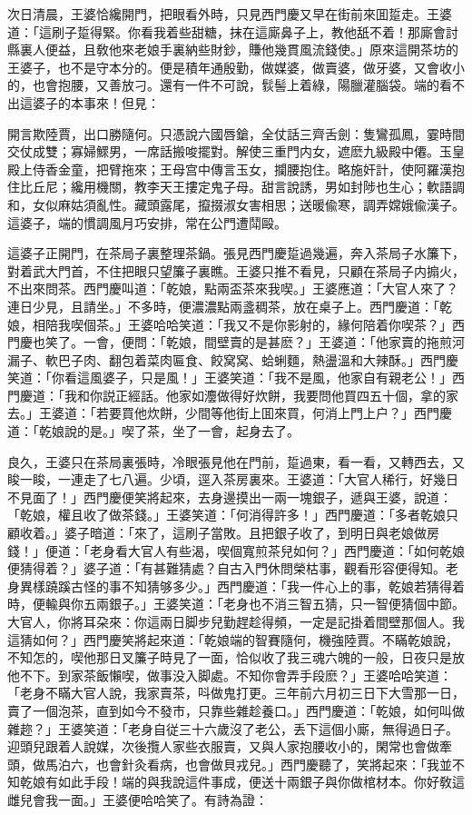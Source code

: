 次日清晨，王婆恰纔開門，把眼看外時，只見西門慶又早在街前來囬踅走。王婆道：「這刷子踅得緊。你看我着些甜糖，抹在這廝鼻子上，教他舐不着！那廝會討縣裏人便益，且敎他來老娘手裏納些財鈔，賺他幾貫風流錢使。」原來這開茶坊的王婆子，也不是守本分的。便是積年通殷勤，做媒婆，做賣婆，做牙婆，又會收小的，也會抱腰，又善放刁。還有一件不可說，䯼髻上着綠，陽臘灌腦袋。端的看不出這婆子的本事來！但見：

開言欺陸賈，出口勝隨何。只憑說六國唇鎗，全仗話三齊舌劍：隻鸞孤鳳，霎時間交仗成雙；寡婦鰥男，一席話搬唆擺對。解使三重門内女，遮麽九級殿中僊。玉皇殿上侍香金童，把臂拖來；王母宫中傳言玉女，攔腰抱住。略施奸計，使阿羅漢抱住比丘尼；纔用機關，教李天王摟定鬼子母。甜言說誘，男如封陟也生心；軟語調和，女似麻姑須亂性。藏頭露尾，攛掇淑女害相思；送暖偸寒，調弄嫦娥偸漢子。這婆子，端的慣調風月巧安排，常在公門遭鬦毆。

這婆子正開門，在茶局子裏整理茶鍋。張見西門慶踅過幾遍，奔入茶局子水簾下，對着武大門首，不住把眼只望簾子裏瞧。王婆只推不看見，只顧在茶局子内搧火，不出來問茶。西門慶叫道：「乾娘，點兩盃茶來我喫。」王婆應道：「大官人來了？連日少見，且請坐。」不多時，便濃濃點兩盞稠茶，放在桌子上。西門慶道：「乾娘，相陪我喫個茶。」王婆哈哈笑道：「我又不是你影射的，緣何陪着你喫茶？」西門慶也笑了。一會，便問：「乾娘，間壁賣的是甚麽？」王婆道：「他家賣的拖煎河漏子、軟巴子肉、翻包着菜肉匾食、餃窝窝、蛤蜊麵，熱盪溫和大辣酥。」西門慶笑道：「你看這風婆子，只是風！」王婆笑道：「我不是風，他家自有親老公！」西門慶道：「我和你説正經話。他家如灋做得好炊餅，我要問他買四五十個，拿的家去。」王婆道：「若要買他炊餅，少間等他街上囬來買，何消上門上户？」西門慶道：「乾娘說的是。」喫了茶，坐了一會，起身去了。

良久，王婆只在茶局裏張時，冷眼張見他在門前，踅過東，看一看，又轉西去，又睃一睃，一連走了七八遍。少頃，逕入茶房裏來。王婆道：「大官人稀行，好幾日不見面了！」西門慶便笑將起來，去身邊摸出一兩一塊銀子，遞與王婆，說道：「乾娘，權且收了做茶錢。」王婆笑道：「何消得許多！」西門慶道：「多者乾娘只顧收着。」婆子暗道：「來了，這刷子當敗。且把銀子收了，到明日與老娘做房錢！」便道：「老身看大官人有些渴，喫個寬煎茶兒如何？」西門慶道：「如何乾娘便猜得着？」婆子道：「有甚難猜處？自古入門休問榮枯事，觀看形容便得知。老身異樣蹺蹊古怪的事不知猜够多少。」西門慶道：「我一件心上的事，乾娘若猜得着時，便輸與你五兩銀子。」王婆笑道：「老身也不消三智五猜，只一智便猜個中節。大官人，你將耳朶來：你這兩日脚步兒勤趕趁得頻，一定是記掛着間壁那個人。我這猜如何？」西門慶笑將起來道：「乾娘端的智賽隨何，機強陸賈。不瞞乾娘說，不知怎的，喫他那日叉簾子時見了一面，恰似收了我三魂六魄的一般，日夜只是放他不下。到家茶飯懶喫，做事没入脚處。不知你會弄手段麽？」王婆哈哈笑道：「老身不瞞大官人說，我家賣茶，呌做鬼打更。三年前六月初三日下大雪那一日，賣了一個泡茶，直到如今不發市，只靠些雜趁養口。」西門慶道：「乾娘，如何叫做雜趂？」王婆笑道：「老身自従三十六歲沒了老公，丢下這個小廝，無得過日子。迎頭兒跟着人說媒，次後攬人家些衣服賣，又與人家抱腰收小的，閑常也會做牽頭，做馬泊六，也會針灸看病，也會做貝戎兒。」西門慶聽了，笑將起來：「我並不知乾娘有如此手段！端的與我說這件事成，便送十兩銀子與你做棺材本。你好敎這雌兒會我一面。」王婆便哈哈笑了。有詩為證：


